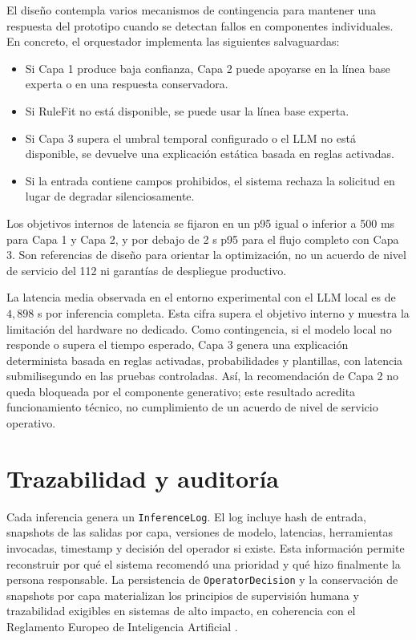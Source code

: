 El diseño contempla varios mecanismos de contingencia para mantener una respuesta del prototipo cuando se detectan fallos en componentes individuales. En concreto, el orquestador implementa las siguientes salvaguardas:

\begin{itemize}
    \item Si Capa 1 produce baja confianza, Capa 2 puede apoyarse en la línea base experta o en una respuesta conservadora.
    \item Si RuleFit no está disponible, se puede usar la línea base experta.
    \item Si Capa 3 supera el umbral temporal configurado o el LLM no está disponible, se devuelve una explicación estática basada en reglas activadas.
    \item Si la entrada contiene campos prohibidos, el sistema rechaza la solicitud en lugar de degradar silenciosamente.
\end{itemize}

Los objetivos internos de latencia se fijaron en un p95 igual o inferior a 500 ms para Capa 1 y Capa 2, y por debajo de 2 s p95 para el flujo completo con Capa 3. Son referencias de diseño para orientar la optimización, no un acuerdo de nivel de servicio del 112 ni garantías de despliegue productivo.

La latencia media observada en el entorno experimental con el LLM local es de \(4{,}898\) s por inferencia completa. Esta cifra supera el objetivo interno y muestra la limitación del hardware no dedicado. Como contingencia, si el modelo local no responde o supera el tiempo esperado, Capa 3 genera una explicación determinista basada en reglas activadas, probabilidades y plantillas, con latencia submilisegundo en las pruebas controladas. Así, la recomendación de Capa 2 no queda bloqueada por el componente generativo; este resultado acredita funcionamiento técnico, no cumplimiento de un acuerdo de nivel de servicio operativo.

\section{Trazabilidad y auditoría}

Cada inferencia genera un \texttt{InferenceLog}. El log incluye hash de entrada, snapshots de las salidas por capa, versiones de modelo, latencias, herramientas invocadas, timestamp y decisión del operador si existe. Esta información permite reconstruir por qué el sistema recomendó una prioridad y qué hizo finalmente la persona responsable. La persistencia de \texttt{OperatorDecision} y la conservación de snapshots por capa materializan los principios de supervisión humana y trazabilidad exigibles en sistemas de alto impacto, en coherencia con el Reglamento Europeo de Inteligencia Artificial \cite{EUAIAct2024}.

